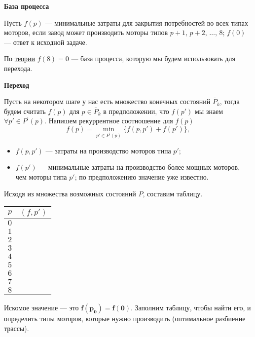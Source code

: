 \bigskip

\textbf{База процесса}

Пусть $f(p)$ --- минимальные затраты для закрытия потребностей во всех типах моторов, если завод может производить моторы типов $p+1$, $p+2$, $\dots$, $8$; $f(0)$ --- ответ к исходной задаче.

По \hyperref[alg:unknown_step_process]{теории} $f(8) = 0$ --- база процесса, которую мы будем использовать для перехода.

\bigskip

\textbf{Переход}

Пусть на некотором шаге у нас есть множество конечных состояний $\bar{P}_k$, тогда будем считать $f(p)$ для $p \in \bar{P}_k$ в предположении, что $f(p')$ мы знаем $\forall p' \in P^{'}(p)$. Напишем рекуррентное соотношение для $f(p)$
\[
\boxed{f(p) = \min_{p' \in P^{'}(p)} \Big\{f(p, p') + f(p') \Big\}},\tag{*}
\]

\begin{itemize}[nosep]
	\item $f(p, p')$ --- затраты на производство моторов типа $p'$;
	
	\item $f(p')$ --- минимальные затраты на производство более мощных моторов, чем моторы типа $p'$; по
	предположению значение уже известно.
\end{itemize}

Исходя из множества возможных состояний $P$, составим таблицу.

\begin{table}[H]
	\centering
	\begin{tabular}{ | c | c |} 
		\hline
		$p$ & $(f, p')$ \\ 
		\hline
		$0$ & \\\hline
		$1$ & \\\hline
		$2$ & \\\hline
		$3$ & \\\hline
		$4$ & \\\hline
		$5$ & \\\hline
		$6$ & \\\hline
		$7$ & \\\hline
		$8$ & \\\hline
	\end{tabular}
\end{table}

Искомое значение --- это $\mathbf{f(p_0) = f(0)}$. Заполним таблицу, чтобы найти его, и определить типы моторов, которые нужно производить (оптимальное разбиение трассы).

